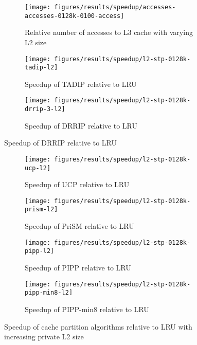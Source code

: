 \begin{figure}[H]
    \centering
    \begin{subfigure}[b]{0.5\textwidth}
        \texttt{[image: figures/results/speedup/accesses-accesses-0128k-0100-access]}
        \caption{Relative number of accesses to L3 cache with varying L2 size}
        \label{fig:results:l2:access}
    \end{subfigure}
    \begin{subfigure}[b]{0.5\textwidth}
        \texttt{[image: figures/results/speedup/l2-stp-0128k-tadip-l2]}
        \caption{Speedup of TADIP relative to LRU}
        \label{fig:results:l2:tadip}
    \end{subfigure}%
    \begin{subfigure}[b]{0.5\textwidth}
        \texttt{[image: figures/results/speedup/l2-stp-0128k-drrip-3-l2]}
        \caption{Speedup of DRRIP relative to LRU}
        \label{fig:results:l2:drrip}
    \end{subfigure}
\end{figure}
\clearpage
\begin{figure}[H]
    \ContinuedFloat
    \begin{subfigure}[b]{0.5\textwidth}
        \texttt{[image: figures/results/speedup/l2-stp-0128k-ucp-l2]}
        \caption{Speedup of UCP relative to LRU}
        \label{fig:results:l2:ucp}
    \end{subfigure}%
    \begin{subfigure}[b]{0.5\textwidth}
        \texttt{[image: figures/results/speedup/l2-stp-0128k-prism-l2]}
        \caption{Speedup of PriSM relative to LRU}
        \label{fig:results:l2:prism}
    \end{subfigure}
    \begin{subfigure}[b]{0.5\textwidth}
        \texttt{[image: figures/results/speedup/l2-stp-0128k-pipp-l2]}
        \caption{Speedup of PIPP relative to LRU}
        \label{fig:results:l2:pipp}
    \end{subfigure}%
    \begin{subfigure}[b]{0.5\textwidth}
        \texttt{[image: figures/results/speedup/l2-stp-0128k-pipp-min8-l2]}
        \caption{Speedup of PIPP-min8 relative to LRU}
        \label{fig:results:l2:pipp-min8}
    \end{subfigure}
    \caption{Speedup of cache partition algorithms relative to LRU with increasing private L2 size}
    \label{fig:results:l2}
\end{figure}

